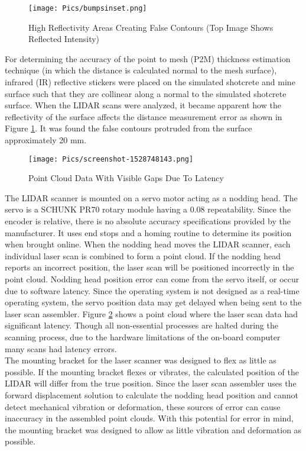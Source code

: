 \begin{figure}
    \centering
    \texttt{[image: Pics/bumpsinset.png]}
    \caption{High Reflectivity Areas Creating False Contours (Top Image Shows Reflected Intensity)}
    \label{fig:bumps}
\end{figure}

For determining the accuracy of the point to mesh (P2M) thickness estimation technique (in which the distance is calculated normal to the mesh surface), infrared (IR) reflective stickers were placed on the simulated shotcrete and mine surface such that they are collinear along a normal to the simulated shotcrete surface. When the LIDAR scans were analyzed, it became apparent how the reflectivity of the surface affects the distance measurement error as shown in Figure \ref{fig:bumps}. It was found the false contours protruded from the surface approximately 20 mm.\\

\begin{figure}
    \centering
    \texttt{[image: Pics/screenshot-1528748143.png]}
    \caption{Point Cloud Data With Visible Gaps Due To Latency}
    \label{fig:headlag}
\end{figure}
The LIDAR scanner is mounted on a servo motor acting as a nodding head. The servo is a SCHUNK PR70 rotary module having a 0.08\degree\hspace{0pt} repeatability. Since the encoder is relative, there is no absolute accuracy specifications provided by the manufacturer. It uses end stops and a homing routine to determine its position when brought online. When the nodding head moves the LIDAR scanner, each individual laser scan is combined to form a point cloud. If the nodding head reports an incorrect position, the laser scan will be positioned incorrectly in the point cloud. Nodding head position error can come from the servo itself, or occur due to software latency. Since the operating system is not designed as a real-time operating system, the servo position data may get delayed when being sent to the laser scan assembler. Figure \ref{fig:headlag} shows a point cloud where the laser scan data had significant latency. Though all non-essential processes are halted during the scanning process, due to the hardware limitations of the on-board computer many scans had latency errors.\\

The mounting bracket for the laser scanner was designed to flex as little as possible. If the mounting bracket flexes or vibrates, the calculated position of the LIDAR will differ from the true position. Since the laser scan assembler uses the forward displacement solution to calculate the nodding head position and cannot detect mechanical vibration or deformation, these sources of error can cause inaccuracy in the assembled point clouds. With this potential for error in mind, the mounting bracket was designed to allow as little vibration and deformation as possible.\\

